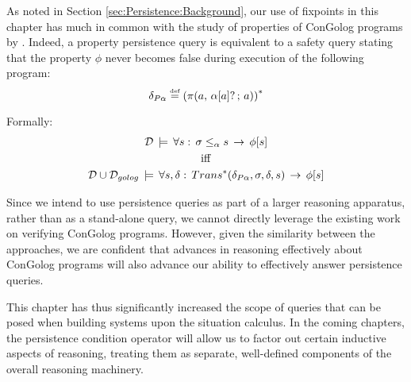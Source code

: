 As noted in Section \ref{sec:Persistence:Background}, our use of
fixpoints in this chapter has much in common with the study of properties
of ConGolog programs by \citep{ternovska97congolog_fixpoint,classen08golog_properties}.
Indeed, a property persistence query is equivalent to a safety query
stating that the property $\phi$ never becomes false during execution
of the following program:\[
\delta_{P\alpha}\stackrel{\mbox{\tiny def}}{=}\left(\pi(a,\,\alpha[a]?\,;\, a)\right)^{*}\]


Formally:\begin{gather*}
\mathcal{D}\,\models\,\forall s:\,\sigma\leq_{\alpha}s\,\rightarrow\,\phi[s]\\
\mathrm{iff}\\
\mathcal{D}\cup\mathcal{D}_{golog}\,\models\,\forall s,\delta:\, Trans^{*}(\delta_{P\alpha},\sigma,\delta,s)\,\rightarrow\,\phi[s]\end{gather*}


Since we intend to use persistence queries as part of a larger reasoning
apparatus, rather than as a stand-alone query, we cannot directly
leverage the existing work on verifying ConGolog programs. However,
given the similarity between the approaches, we are confident that
advances in reasoning effectively about ConGolog programs will also
advance our ability to effectively answer persistence queries.

This chapter has thus significantly increased the scope of queries
that can be posed when building systems upon the situation calculus.
In the coming chapters, the persistence condition operator will allow
us to factor out certain inductive aspects of reasoning, treating
them as separate, well-defined components of the overall reasoning
machinery.

